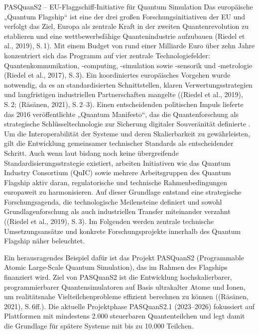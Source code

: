 PASQuanS2 – EU-Flaggschiff-Initiative für Quantum Simulation
Das europäische „Quantum Flagship“ ist eine der drei großen Forschungsinitiativen der EU und verfolgt das Ziel, Europa als zentrale Kraft in der zweiten Quantenrevolution zu etablieren und eine wettbewerbsfähige Quantenindustrie aufzubauen \citealp[1]{r} \cite{}(Riedel et al., 2019), S. 1). Mit einem Budget von rund einer Milliarde Euro über zehn Jahre konzentriert sich das Programm auf vier zentrale Technologiefelder: Quantenkommunikation, -computing, -simulation sowie -sensorik und -metrologie \cite{}(Riedel et al., 2017), S. 3).
Ein koordiniertes europäisches Vorgehen wurde notwendig, da es an standardisierten Schnittstellen, klaren Verwertungsstrategien und langfristigen industriellen Partnerschaften mangelte \cite{}((Riedel et al., 2019), S. 2; \citealp[2ff.]{}(Räsänen, 2021), S. 2–3). Einen entscheidenden politischen Impuls lieferte das 2016 veröffentlichte „Quantum Manifesto“, das die Quantenforschung als strategische Schlüsseltechnologie zur Sicherung digitaler Souveränität definierte \citealp[1]{vandeventerEuropeanStandardsQuantum2022}. Um die Interoperabilität der Systeme und deren Skalierbarkeit zu gewährleisten, gilt die Entwicklung gemeinsamer technischer Standards als entscheidender Schritt. Auch wenn laut \citealp[2ff.]{vandeventerEuropeanStandardsQuantum2022} bislang noch keine übergreifende Standardisierungsstrategie existiert, arbeiten Initiativen wie das Quantum Industry Consortium (QuIC) sowie mehrere Arbeitsgruppen des Quantum Flagship aktiv daran, regulatorische und technische Rahmenbedingungen europaweit zu harmonisieren. Auf dieser Grundlage entstand eine strategische Forschungsagenda, die technologische Meilensteine definiert und sowohl Grundlagenforschung als auch industriellen Transfer miteinander verzahnt \cite{}((Riedel et al., 2019), S. 3). Im Folgenden werden zentrale technische Umsetzungsansätze und konkrete Forschungsprojekte innerhalb des Quantum Flagship näher beleuchtet.

Ein herausragendes Beispiel dafür ist das Projekt PASQuanS2 (Programmable Atomic Large-Scale Quantum Simulation), das im Rahmen des Flagships finanziert wird. Ziel von PASQuanS2 ist die Entwicklung hochskalierbarer, programmierbarer Quantensimulatoren auf Basis ultrakalter Atome und Ionen, um realitätsnahe Vielteilchenprobleme effizient berechnen zu können \cite{}((Räsänen, 2021), S. 6ff.). Die aktuelle Projektphase PASQuanS2.1 (2023–2026) fokussiert auf Plattformen mit mindestens 2.000 steuerbaren Quantenteilchen und legt damit die Grundlage für spätere Systeme mit bis zu 10.000 Teilchen. 

